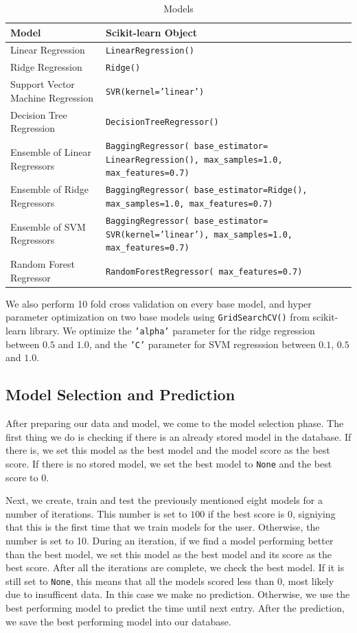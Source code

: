 \begin{table}[htbp]
  \caption[Models]{Models}\label{tab:models}
  \centering
  \begin{tabular}{l|p{6cm}}
    Model&Scikit-learn Object\\ \toprule
    Linear Regression&\texttt{LinearRegression()}\\ \hline
    Ridge Regression&\texttt{Ridge()}\\ \hline
    Support Vector Machine Regression&\texttt{SVR(kernel='linear')}\\ \hline
    Decision Tree Regression&\texttt{DecisionTreeRegressor()}\\ \hline
    Ensemble of Linear Regressors&\texttt{BaggingRegressor( base\_estimator= LinearRegression(), max\_samples=1.0, max\_features=0.7)}\\ \hline
    Ensemble of Ridge Regressors &\texttt{BaggingRegressor( base\_estimator=Ridge(), max\_samples=1.0, max\_features=0.7)}\\ \hline
    Ensemble of SVM Regressors &\texttt{BaggingRegressor( base\_estimator= SVR(kernel='linear'), max\_samples=1.0, max\_features=0.7)}\\ \hline
    Random Forest Regressor&\texttt{RandomForestRegressor( max\_features=0.7)}\\ \hline
  \end{tabular}
\end{table}

We also perform 10 fold cross validation on every base model, and hyper parameter optimization on two base models using \texttt{GridSearchCV()} from scikit-learn library.
We optimize the \texttt{'alpha'} parameter for the ridge regression between $0.5$ and $1.0$, 
and the \texttt{'C'} parameter for SVM regresssion between $0.1$, $0.5$ and $1.0$.

\subsection{Model Selection and Prediction}
After preparing our data and model, we come to the model selection phase.
The first thing we do is checking if there is an already stored model in the database.
If there is, we set this model as the best model and the model score as the best score.
If there is no stored model, we set the best model to \texttt{None} and the best score to $0$.

Next, we create, train and test the previously mentioned eight models for a number of iterations.
This number is set to $100$ if the best score is $0$, signiying that this is the first time that we train models for the user.
Otherwise, the number is set to 10.
During an iteration, if we find a model performing better than the best model, we set this model as the best model and its score as the best score.
After all the iterations are complete, we check the best model.
If it is still set to \texttt{None}, this means that all the models scored less than $0$, most likely due to insufficent data.
In this case we make no prediction.
Otherwise, we use the best performing model to predict the time until next entry.
After the prediction, we save the best performing model into our database.


